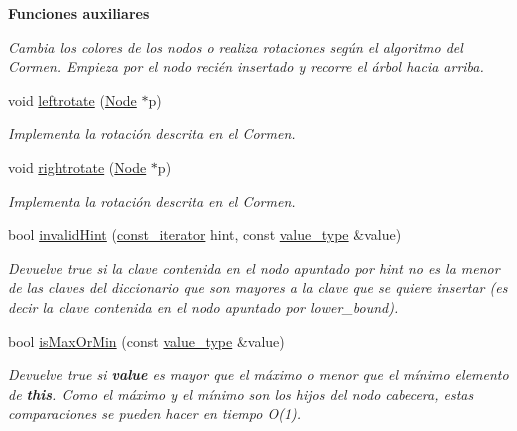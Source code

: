 \begin{Indent}{\bf Funciones auxiliares}
\begin{DoxyCompactItemize}
\begin{DoxyCompactList}\small\item\em Cambia los colores de los nodos o realiza rotaciones según el algoritmo del Cormen. Empieza por el nodo recién insertado y recorre el árbol hacia arriba. \end{DoxyCompactList}\item 
void \hyperlink{classaed2_1_1map_ad764851f1534f2db0964c4f729056a1e_ad764851f1534f2db0964c4f729056a1e}{leftrotate} (\hyperlink{structaed2_1_1map_1_1Node}{Node} $\ast$p)
\begin{DoxyCompactList}\small\item\em Implementa la rotación descrita en el Cormen. \end{DoxyCompactList}\item 
void \hyperlink{classaed2_1_1map_a816d69fa4dfe18a984dc3628fee14e2f_a816d69fa4dfe18a984dc3628fee14e2f}{rightrotate} (\hyperlink{structaed2_1_1map_1_1Node}{Node} $\ast$p)
\begin{DoxyCompactList}\small\item\em Implementa la rotación descrita en el Cormen. \end{DoxyCompactList}\item 
bool \hyperlink{classaed2_1_1map_a7403745a296985d64b8666c18953b2c0_a7403745a296985d64b8666c18953b2c0}{invalid\+Hint} (\hyperlink{classaed2_1_1map_1_1const__iterator}{const\+\_\+iterator} hint, const \hyperlink{classaed2_1_1map_a719db98e0ff9a837610f76be33264680_a719db98e0ff9a837610f76be33264680}{value\+\_\+type} \&value)
\begin{DoxyCompactList}\small\item\em Devuelve true si la clave contenida en el nodo apuntado por hint {\itshape  no es } la menor de las claves del diccionario que son mayores a la clave que se quiere insertar (es decir la clave contenida en el nodo apuntado por lower\+\_\+bound). \end{DoxyCompactList}\item 
bool \hyperlink{classaed2_1_1map_a81db4ead6daafe94938d5410173bdb6c_a81db4ead6daafe94938d5410173bdb6c}{is\+Max\+Or\+Min} (const \hyperlink{classaed2_1_1map_a719db98e0ff9a837610f76be33264680_a719db98e0ff9a837610f76be33264680}{value\+\_\+type} \&value)
\begin{DoxyCompactList}\small\item\em Devuelve true si {\bfseries value} es mayor que el máximo o menor que el mínimo elemento de {\bfseries this}. Como el máximo y el mínimo son los hijos del nodo cabecera, estas comparaciones se pueden hacer en tiempo O(1). \end{DoxyCompactList}\item 

\end{DoxyCompactItemize}
\end{Indent}
